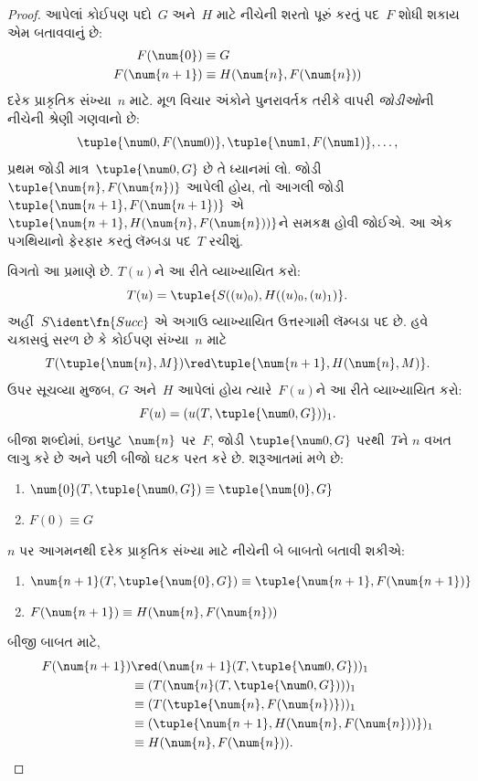 \documentclass[../../../include/open-logic-section]{subfiles}
\begin{document}
\begin{proof}
આપેલાં કોઈપણ પદો~$G$ અને~$H$ માટે નીચેની શરતો પૂરું કરતું
પદ~$F$ શોધી શકાય એમ બતાવવાનું છે:
\begin{align*}
F(\num{0}) & \equiv G \\
F(\num{n+1}) & \equiv H(\num{n}, F(\num{n}))
\end{align*}
દરેક પ્રાકૃતિક સંખ્યા~$n$ માટે. મૂળ વિચાર અંકોને પુનરાવર્તક તરીકે
વાપરી \emph{જોડીઓ}ની નીચેની શ્રેણી ગણવાનો છે:
\[
\tuple{\num 0, F(\num 0)}, \tuple{\num 1, F(\num 1)}, \dots,
\]
પ્રથમ જોડી માત્ર~$\tuple{\num 0, G}$ છે તે ધ્યાનમાં લો. જોડી
$\tuple{\num{n}, F(\num{n})}$ આપેલી હોય, તો આગલી જોડી
$\tuple{\num{n+1}, F(\num{n+1})}$ એ
$\tuple{\num{n+1}, H(\num{n}, F(\num{n}))}$ને સમકક્ષ હોવી
જોઈએ. આ એક પગથિયાનો ફેરફાર કરતું લૅમ્બડા પદ~$T$ રચીશું.

વિગતો આ પ્રમાણે છે. $T(u)$ને આ રીતે વ્યાખ્યાયિત કરો:
\[
T(u) = \tuple{S((u)_0), H((u)_0,(u)_1)}.
\]
અહીં~$S\ident\fn{Succ}$ એ અગાઉ વ્યાખ્યાયિત ઉત્તરગામી લૅમ્બડા પદ છે.
હવે ચકાસવું સરળ છે કે કોઈપણ સંખ્યા~$n$ માટે
\[
T(\tuple{\num{n}, M}) \red \tuple{\num{n+1}, H(\num{n}, M)}.
\]
ઉપર સૂચવ્યા મુજબ, $G$ અને~$H$ આપેલાં હોય ત્યારે~$F(u)$ને
આ રીતે વ્યાખ્યાયિત કરો:
\[
F(u) = (u(T,\tuple{\num 0, G}))_1.
\]
બીજા શબ્દોમાં, ઇનપુટ~$\num{n}$ પર~$F$, જોડી
$\tuple{\num 0, G}$ પરથી~$T$ને $n$ વખત લાગુ કરે છે અને પછી
બીજો ઘટક પરત કરે છે. શરૂઆતમાં મળે છે:
\begin{enumerate}
\item $\num{0} (T, \tuple{\num 0, G}) \equiv \tuple{\num{0}, G}$
\item $F(\num{0}) \equiv G$
\end{enumerate}
$n$ પર આગમનથી દરેક પ્રાકૃતિક સંખ્યા માટે નીચેની બે બાબતો
બતાવી શકીએ:
\begin{enumerate}
\item $\num{n+1}(T, \tuple{\num{0}, G}) \equiv \tuple{\num{n+1}, F(\num{n+1})}$
\item $F(\num{n+1}) \equiv H(\num{n}, F(\num{n}))$
\end{enumerate}
બીજી બાબત માટે,
\begin{align*}
F(\num{n+1}) & \red (\num{n+1}(T, \tuple{\num 0, G}))_1 \\
& \equiv (T(\num{n} (T, \tuple{\num 0, G})))_1 \\
& \equiv (T(\tuple{\num{n}, F(\num{n})}))_1 \\
& \equiv (\tuple{\num{n+1}, H(\num{n}, F(\num{n}))})_1 \\
& \equiv H(\num{n}, F(\num{n})).
\end{align*}

\end{proof}
\end{document}
